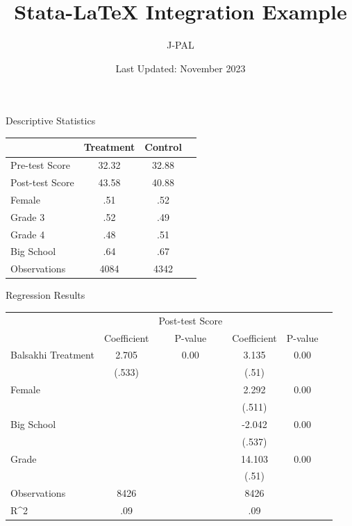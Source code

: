 \documentclass{article}
\title{Stata-LaTeX Integration Example}
\author{J-PAL}
\date{Last Updated: November 2023}
\begin{document}
\maketitle
\begin{center}
\begin{threeparttable}
\caption{Descriptive Statistics}
\begin{tabular}{p{4.5cm}ccc}
\toprule \toprule
& Treatment & Control  \\
\midrule
 Pre-test Score & 32.32 & 32.88 \\ 
 Post-test Score & 43.58 & 40.88 \\ 
 Female & .51 & .52 \\ 
 Grade 3 & .52 & .49 \\ 
 Grade 4 & .48 & .51 \\ 
 Big School & .64 & .67 \\ 
\midrule
Observations & 4084  & 4342  \\ 
\bottomrule
\end{tabular}
\end{threeparttable}
\end{center}
\begin{center}
\begin{threeparttable}
\caption{Regression Results}
\begin{tabular}{p{3cm}ccccc}
\toprule \toprule
& & Post-test Score & \\
& Coefficient & P-value & Coefficient & P-value \\
\midrule
Balsakhi Treatment &  2.705  & 0.00 & 3.135 & 0.00 \\
& (.533)  &     &  (.51) &  \\
 Female  &   & &  2.292 & 0.00 \\ 
& & &  (.511)  &  \\
 Big School  &   & &  -2.042 & 0.00 \\ 
& & &  (.537)  &  \\
 Grade  &   & &  14.103 & 0.00 \\ 
& & &  (.51)  &  \\
\midrule
Observations & 8426  & &  8426 & \\ 
R^2 & .09  & &  .09 & \\ 
\bottomrule
\end{tabular}
\end{threeparttable}
\end{center}
\end{document}
